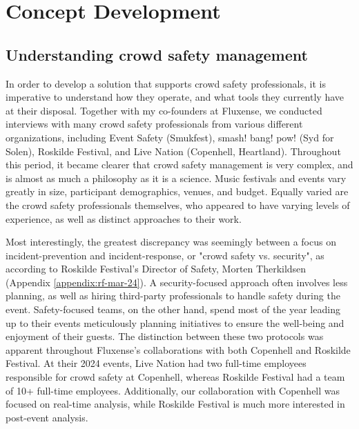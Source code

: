 \chapter{Concept Development}
\label{chap:concept-development}


\section{Understanding crowd safety management}
\label{sec:crowd-safety}

In order to develop a solution that supports crowd safety professionals, it is imperative to understand how they operate, and what tools they currently have at their disposal. Together with my co-founders at Fluxense, we conducted interviews with many crowd safety professionals from various different organizations, including Event Safety (Smukfest), smash! bang! pow! (Syd for Solen), Roskilde Festival, and Live Nation (Copenhell, Heartland). Throughout this period, it became clearer that crowd safety management is very complex, and is almost as much a philosophy as it is a science. Music festivals and events vary greatly in size, participant demographics, venues, and budget. Equally varied are the crowd safety professionals themselves, who appeared to have varying levels of experience, as well as distinct approaches to their work.

Most interestingly, the greatest discrepancy was seemingly between a focus on incident-prevention and incident-response, or "crowd safety vs. security", as according to Roskilde Festival's Director of Safety, Morten Therkildsen (Appendix \ref{appendix:rf-mar-24}). A security-focused approach often involves less planning, as well as hiring third-party professionals to handle safety during the event. Safety-focused teams, on the other hand, spend most of the year leading up to their events meticulously planning initiatives to ensure the well-being and enjoyment of their guests. The distinction between these two protocols was apparent throughout Fluxense's collaborations with both Copenhell and Roskilde Festival. At their 2024 events, Live Nation had two full-time employees responsible for crowd safety at Copenhell, whereas Roskilde Festival had a team of 10+ full-time employees. Additionally, our collaboration with Copenhell was focused on real-time analysis, while Roskilde Festival is much more interested in post-event analysis.

